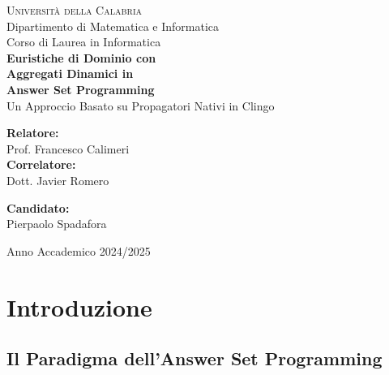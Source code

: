 \documentclass[a4paper,12pt,twoside,openright]{report}
\begin{document}
\begin{titlepage}
    \centering
    \vspace*{1cm}

    {\Large \textsc{Universit\`{a} della Calabria}}\\[0.3cm]
    {\large Dipartimento di Matematica e Informatica}\\[0.3cm]
    {\large Corso di Laurea in Informatica}\\[2cm]

    {\Huge \textbf{Euristiche di Dominio con\\Aggregati Dinamici in\\Answer Set Programming}}\\[0.5cm]
    {\Large Un Approccio Basato su Propagatori Nativi in Clingo}\\[3cm]

    \begin{minipage}[t]{0.45\textwidth}
        \raggedright
        {\large \textbf{Relatore:}}\\[0.2cm]
        {\large Prof. Francesco Calimeri}\\[0.5cm]
        {\large \textbf{Correlatore:}}\\[0.2cm]
        {\large Dott. Javier Romero}
    \end{minipage}
    \hfill
    \begin{minipage}[t]{0.45\textwidth}
        \raggedleft
        {\large \textbf{Candidato:}}\\[0.2cm]
        {\large Pierpaolo Spadafora}\\[0.2cm]
    \end{minipage}

    \vfill
    {\large Anno Accademico 2024/2025}
\end{titlepage}

\tableofcontents
\newpage

\chapter{Introduzione}
\label{ch:introduzione}

\section{Il Paradigma dell'Answer Set Programming}
\end{document}
